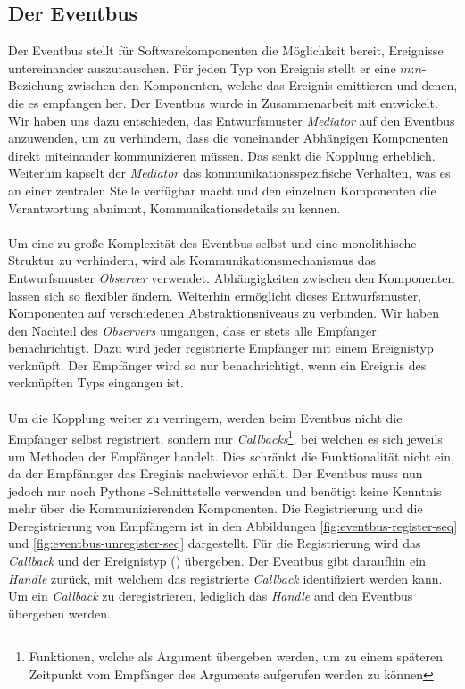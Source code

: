 \subsection{Der Eventbus}

Der Eventbus stellt für Softwarekomponenten die Möglichkeit bereit, Ereignisse untereinander auszutauschen. Für jeden Typ von Ereignis stellt er eine $m$:$n$-Beziehung zwischen den Komponenten, welche das Ereignis emittieren und denen, die es empfangen her. Der Eventbus wurde in Zusammenarbeit mit \citeauthor{persitzky_fehlerinjektion_2023} entwickelt. Wir haben uns dazu entschieden, das Entwurfsmuster \emph{Mediator} auf den Eventbus anzuwenden, um zu verhindern, dass die voneinander Abhängigen Komponenten direkt miteinander kommunizieren müssen. Das senkt die Kopplung erheblich. Weiterhin kapselt der \emph{Mediator} das kommunikationsspezifische Verhalten, was es an einer zentralen Stelle verfügbar macht und den einzelnen Komponenten die Verantwortung abnimmt, Kommunikationsdetails zu kennen.\\
\\
Um eine zu große Komplexität des Eventbus selbst und eine monolithische Struktur zu verhindern, wird als Kommunikationsmechanismus das Entwurfsmuster \emph{Observer} verwendet. Abhängigkeiten zwischen den Komponenten lassen sich so flexibler ändern. Weiterhin ermöglicht dieses Entwurfsmuster, Komponenten auf verschiedenen Abstraktionsniveaus zu verbinden. Wir haben den Nachteil des \emph{Observers} umgangen, dass er stets alle Empfänger benachrichtigt. Dazu wird jeder registrierte Empfänger mit einem Ereignistyp verknüpft. Der Empfänger wird so nur benachrichtigt, wenn ein Ereignis des verknüpften Typs eingangen ist.\\
\\
Um die Kopplung weiter zu verringern, werden beim Eventbus nicht die Empfänger selbst registriert, sondern nur \emph{Callbacks}\footnote{Funktionen, welche als Argument übergeben werden, um zu einem späteren Zeitpunkt vom Empfänger des Arguments aufgerufen werden zu können}, bei welchen es sich jeweils um Methoden der Empfänger handelt. Dies schränkt die Funktionalität nicht ein, da der Empfännger das Ereginis nachwievor erhält. Der Eventbus muss nun jedoch nur noch Pythons -Schnittstelle verwenden und benötigt keine Kenntnis mehr über die Kommunizierenden Komponenten. Die Registrierung und die Deregistrierung von Empfängern ist in den Abbildungen \ref{fig:eventbus-register-seq} und \ref{fig:eventbus-unregister-seq} dargestellt. Für die Registrierung wird das \emph{Callback} und der Ereignistyp () übergeben. Der Eventbus gibt daraufhin ein \emph{Handle} zurück, mit welchem das registrierte \emph{Callback} identifiziert werden kann. Um ein \emph{Callback} zu deregistrieren, lediglich das \emph{Handle} and den Eventbus übergeben werden.

